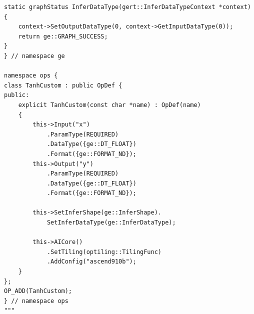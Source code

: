 \documentclass{article} %
\theoremstyle{definition}
\theoremstyle{remark}
\begin{document}
\begin{tcolorbox}[colback=yellow!8, colframe=yellow!40, boxrule=0.3pt, arc=0pt, left=2pt, right=2pt, top=0pt, bottom=0pt, breakable, nobeforeafter]
\begin{verbatim}
static graphStatus InferDataType(gert::InferDataTypeContext *context)
{
    context->SetOutputDataType(0, context->GetInputDataType(0));
    return ge::GRAPH_SUCCESS;
}
} // namespace ge

namespace ops {
class TanhCustom : public OpDef {
public:
    explicit TanhCustom(const char *name) : OpDef(name)
    {
        this->Input("x")
            .ParamType(REQUIRED)
            .DataType({ge::DT_FLOAT})
            .Format({ge::FORMAT_ND});
        this->Output("y")
            .ParamType(REQUIRED)
            .DataType({ge::DT_FLOAT})
            .Format({ge::FORMAT_ND});

        this->SetInferShape(ge::InferShape).
            SetInferDataType(ge::InferDataType);

        this->AICore()
            .SetTiling(optiling::TilingFunc)
            .AddConfig("ascend910b");
    }
};
OP_ADD(TanhCustom);
} // namespace ops
"""
  \end{verbatim}
  \end{tcolorbox}
\end{document}

